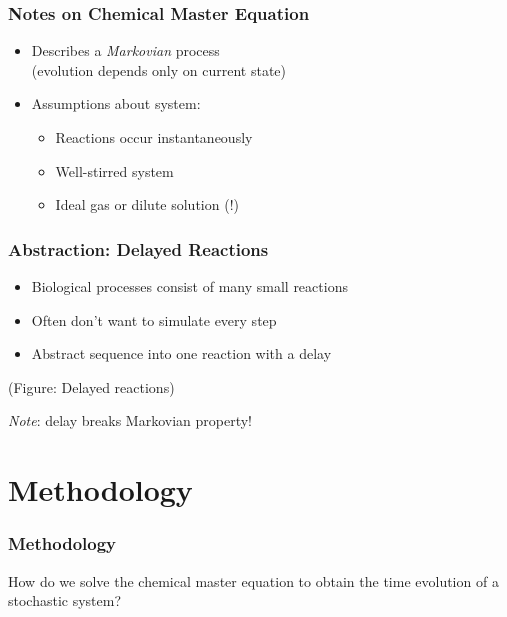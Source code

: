 \documentclass[xcolor={usenames,dvipsnames,svgnames}]{beamer}
\begin{document}
\begin{frame}
    \frametitle{Notes on Chemical Master Equation}
    \begin{itemize}
        \item Describes a \emph{Markovian} process\\
            (evolution depends only on current state)

        \item Assumptions about system:
        \begin{itemize}
            \item Reactions occur instantaneously
            \item Well-stirred system
            \item Ideal gas or dilute solution (!)
        \end{itemize}
    \end{itemize}
\end{frame}

\begin{frame}
    \frametitle{Abstraction: Delayed Reactions}
    \begin{itemize}
        \item Biological processes consist of many small reactions
        \item Often don't want to simulate every step
        \item Abstract sequence into one reaction with a delay
    \end{itemize}
    (Figure: Delayed reactions)
    \pause

    \emph{Note}: delay breaks Markovian property!
\end{frame}


\section{Methodology} %
\label{sec:methodology}

\begin{frame}
    \frametitle{Methodology}
    How do we solve the chemical master equation to obtain the time evolution of a stochastic system?
\end{frame}
\end{document}

